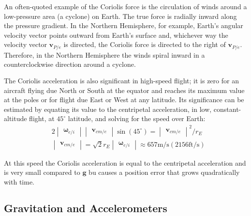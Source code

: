 An often-quoted example of the Coriolis force is the circulation of winds around a low-pressure area (a cyclone) on Earth. The true force is radially inward along the pressure gradient. In the Northern Hemisphere, for example, Earth's angular velocity vector points outward from Earth's surface and, whichever way the velocity vector \({\mathbf{v}_{P/e}}\) is directed, the Coriolis force is directed to the right of \({\mathbf{v}_{P/e}}\). Therefore, in the Northern Hemisphere the winds spiral inward in a counterclockwise direction around a cyclone.

The Coriolis acceleration is also significant in high-speed flight; it is zero for an aircraft flying due North or South at the equator and reaches its maximum value at the poles or for flight due East or West at any latitude. Its significance can be estimated by equating its value to the centripetal acceleration, in low, constant-altitude flight, at \(45^{\circ}\) latitude, and solving for the speed over Earth:
\begin{align*}
    &2 \! \begin{vmatrix}{\mathbf{\omega}_{e/i}}\end{vmatrix} \begin{vmatrix}{\mathbf{v}_{cm/e}}\end{vmatrix}\sin\!{\left({45^{\circ}}\right)} = {\begin{vmatrix}{\mathbf{v}_{cm/e}}\end{vmatrix}^{2}} / {r_{E}} \\
    &\begin{vmatrix}{\mathbf{v}_{cm/e}}\end{vmatrix} = {\sqrt{2}}{r_{E}} \begin{vmatrix} {\mathbf{\omega}_{e/i}}\end{vmatrix} \approx 657\text{m/s} \left(2156\text{ft/s}\right)
\end{align*}

At this speed the Coriolis acceleration is equal to the centripetal acceleration and is very small compared to \(\mathbf{g}\) bu causes a position error that grows quadratically with time.

\subsection{Gravitation and Accelerometers}

